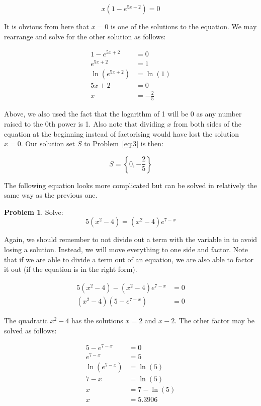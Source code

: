 \documentclass[12pt]{article}
\theoremstyle{definition}
\newtheorem{problem}{Problem}
\begin{document}
\begin{equation}
    x(1-e^{5x+2}) = 0
\end{equation}

It is obvious from here that $x=0$ is one of the solutions to the equation.
We may rearrange and solve for the other solution as follows:

\begin{align}
    1-e^{5x+2}    & = 0            \\
    e^{5x+2}      & = 1            \\
    \ln(e^{5x+2}) & = \ln(1)       \\
    5x + 2        & = 0            \\
    x             & = -\frac{2}{5}
\end{align}

Above, we also used the fact that the logarithm of 1 will be 0 as any number raised to the 0th power is 1.
Also note that dividing $x$ from both sides of the equation at the beginning instead of factorising would have lost the solution $x=0$.
Our solution set $S$ to Problem~\eqref{eq:3} is then:

\begin{equation}
    S = \left\{0, -\frac{2}{5} \right\}
\end{equation}

The following equation looks more complicated but can be solved in relatively the same way as the previous one.

\begin{problem}
Solve:
\begin{equation*}
    5(x^2-4) = (x^2-4)e^{7-x} \label{eq:4}
\end{equation*}
\end{problem}

Again, we should remember to not divide out a term with the variable in to avoid losing a solution.
Instead, we will move everything to one side and factor.
Note that if we are able to divide a term out of an equation, we are also able to factor it out (if the equation is in the right form).

\begin{align}
    5(x^2-4) - (x^2-4)e^{7-x} & = 0 \\
    (x^2-4)(5-e^{7-x})        & = 0
\end{align}

The quadratic $x^2-4$ has the solutions $x=2$ and $x-2$.
The other factor may be solved as follows:

\begin{align}
    5-e^{7-x}    & = 0        \\
    e^{7-x}      & = 5        \\
    \ln(e^{7-x}) & = \ln(5)   \\
    7-x          & = \ln(5)   \\
    x            & = 7-\ln(5) \\
    x            & = 5.3906
\end{align}
\end{document}

